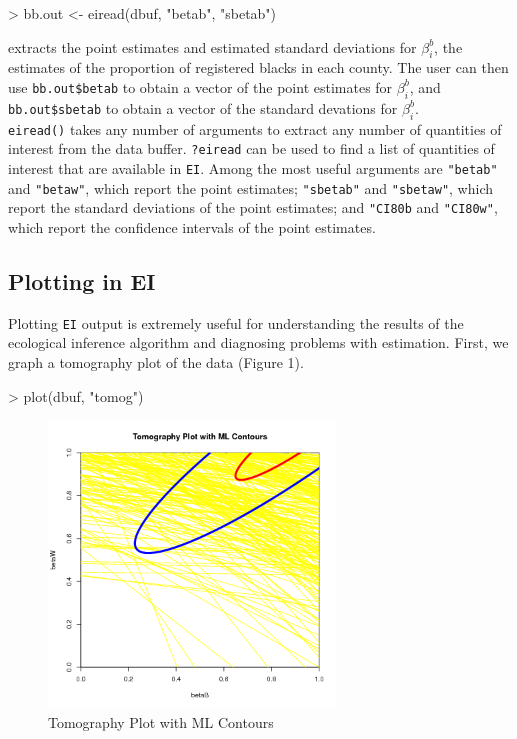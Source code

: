 \documentclass[11pt,oneside,letterpaper,titlepage]{article}
\begin{document}
\begin{Schunk}
\begin{Sinput}
> bb.out <- eiread(dbuf, "betab", "sbetab")
\end{Sinput}
\end{Schunk}

\noindent extracts the point estimates and estimated standard deviations for $\beta_i^b$, the estimates of the proportion of registered blacks in each county.  The user can then use \verb#bb.out$betab# to obtain a vector of the point estimates for $\beta_i^b$, and \verb#bb.out$sbetab# to obtain a vector of the standard devations for $\beta_i^b$.  \\
\newline
\verb#eiread()# takes any number of arguments to extract any number of quantities of interest from the data buffer.  \verb#?eiread# can be used to find a list of quantities of interest that are available in \verb#EI#.  Among the most useful arguments are \verb#"betab"# and \verb#"betaw"#, which report the point estimates; \verb#"sbetab"# and \verb#"sbetaw"#, which report the standard deviations of the point estimates; and \verb#"CI80b# and \verb#"CI80w"#, which report the confidence intervals of the point estimates.  

\subsection{Plotting in EI}

Plotting \verb#EI# output is extremely useful for understanding the results of the ecological inference algorithm and diagnosing problems with estimation.  First, we graph a tomography plot of the data (Figure 1).

\begin{Schunk}
\begin{Sinput}
> plot(dbuf, "tomog")
\end{Sinput}
\end{Schunk}

\begin{figure}[h]
\begin{center}
\includegraphics[width=3in, height=3in,   viewport=0 0 420 395,clip]{tomogplot.png} 
\end{center}
\caption{Tomography Plot with ML Contours}
\label{fig:tomog}
\end{figure}
\end{document}
